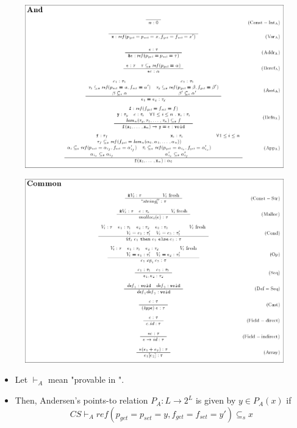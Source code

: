 \documentclass{beamer}
\begin{document}
\begin{frame}[allowframebreaks]
  \framebreak

  \begin{figure}
    \centering
    \includegraphics[scale=0.3]{andersen_inference_rules.png}
  \end{figure}

  \framebreak

  \begin{figure}
    \centering
    \includegraphics[scale=0.3]{common_inference_rules.png}
  \end{figure}

  \framebreak

  \begin{itemize}
  \item Let $\vdash_A$ mean "provable in ".
  \item Then, Andersen's points-to relation $P_A: L \rightarrow 2^L$
    is given by $ y \in P_A(x) $ if 
    $$ CS \vdash_A ref(p_{get}=p_{set}=y, f_{get}=f_{set}=y') \subseteq_s x $$
  \end{itemize}

\end{frame}
\end{document}
